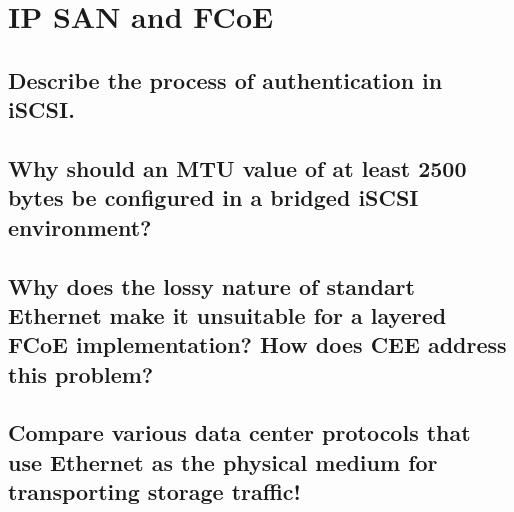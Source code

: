 \section{IP SAN and FCoE} %
\label{sec:ip_san_and_fcoe}

\subsection{Describe the process of authentication in iSCSI.} %
\label{sub:describe_the_process_of_authentication_in_iscsi}


\subsection{Why should an MTU value of at least 2500 bytes be configured in a bridged iSCSI environment?} %
\label{sub:why_should_an_mtu_value_of_at_least_2500_bytes_be_configured_in_a_bridged_iscsi_environment}


\subsection{Why does the lossy nature of standart Ethernet make it unsuitable for a layered FCoE implementation? How does CEE address this problem?} %
\label{sub:why_does_the_lossy_nature_of_standart_ethernet_make_it_unsuitable_for_a_layered_fcoe_implementation_how_does_cee_address_this_problem}   	


\subsection{Compare various data center protocols that use Ethernet as the physical medium for transporting storage traffic!} %
\label{sub:compare_various_data_center_protocols_that_use_ethernet_as_the_physical_medium_for_transporting_storage_traffic}


